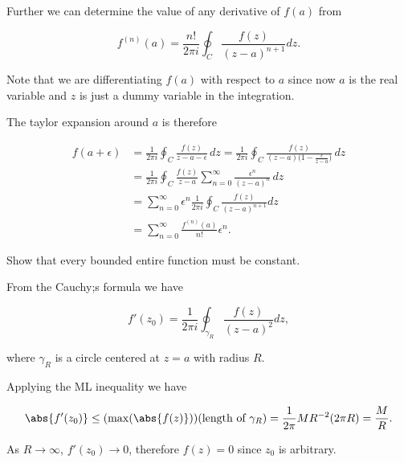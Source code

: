 \documentclass[english,a4paper,12pt]{report}
\begin{document}
Further we can determine the value of any derivative of \(f(a)\) from 

\begin{equation}
    f^{(n)}(a) = \frac{n!}{2\pi i} \oint_{C} \frac{f(z)}{(z-a)^{n+1} } dz. 
\end{equation}

Note that we are differentiating \(f(a)\) with respect to \(a\) since now \(a\) is the real variable and \(z\) is just a dummy variable in the integration. 

The taylor expansion around \(a\) is therefore 

\begin{equation}
    \begin{aligned}
        f(a+\epsilon) &= \frac{1}{2\pi i}\oint_C \frac{f(z)}{z - a - \epsilon}\,dz = \frac{1}{2\pi i}\oint_C \frac{f(z)}{(z - a)\bigl(1 - \frac{\epsilon}{z-a}\bigr)}\,dz \\
&= \frac{1}{2\pi i}\oint_C \frac{f(z)}{z - a}  \sum_{n=0}^{\infty} \frac{\epsilon^n}{(z - a)^n}\,dz  \\
&= \sum_{n=0}^{\infty} \epsilon ^{n} \frac{1}{2\pi i} \oint_{C} \frac{f(z)}{(z-a)^{n+1} } dz \\
&= \sum_{n=0}^{\infty} \frac{f^{(n)}(a) }{n!} \epsilon ^{n}.      
    \end{aligned}
\end{equation}

{Show that every bounded entire function must be constant.}
{From the Cauchy;s formula we have 

\begin{equation}
    f'(z_0 ) = \frac{1}{2\pi i} \oint_{\gamma _{R} } \frac{f(z)}{(z-a)^2} dz,   
\end{equation}

where \(\gamma _{R} \) is a circle centered at \(z = a\) with radius \(R\).

Applying the ML inequality we have 

\begin{equation}
    \abs{f'(z_0 )} \le (\max (\abs{f(z)} )) (\text{length of } \gamma _{R} ) = \frac{1}{2\pi } MR^{-2} (2\pi R) = \frac{M}{R}.   
\end{equation}

As \(R \to \infty\), \(f'(z_0 ) \to 0\), therefore \(f(z) = 0\) since \(z_0 \) is arbitrary.   
} 
\end{document}
